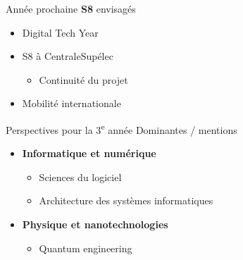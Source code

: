 \begin{frame}{Année prochaine}
\textbf{S8} envisagés
\begin{itemize}
  \item Digital Tech Year
  \item S8 à CentraleSupélec
  \begin{itemize}
      \item Continuité du projet
  \end{itemize}
  \item Mobilité internationale
\end{itemize}
\end{frame}

\begin{frame}{Perspectives pour la 3\textsuperscript{e} année}
Dominantes / mentions
\vspace{.5em}
\begin{itemize}
  \item \textbf{Informatique et numérique}
  \begin{itemize}
      \item Sciences du logiciel
      \item Architecture des systèmes informatiques
  \end{itemize}
  \item \textbf{Physique et nanotechnologies}
  \begin{itemize}
      \item Quantum engineering
  \end{itemize}
\end{itemize}
\end{frame}
